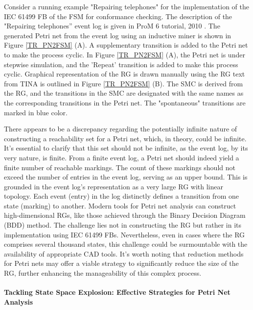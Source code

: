 \begin{bibunit}
Consider a running example "Repairing telephones" for the implementation of the IEC 61499 FB of the FSM for conformance checking. The description of the "Repairing telephones'' event log is given in ProM 6 tutorial, 2010 \cite{prom6tutorial}. The generated Petri net from the event log using an inductive miner is shown in Figure \ref{TR_PN2FSM} (A). A supplementary transition is added to the Petri net to make the process cyclic. In Figure \ref{TR_PN2FSM} (A), the Petri net is under stepwise simulation, and the 'Repeat' transition is added to make this process cyclic. Graphical representation of the RG is drawn manually using the RG text from TINA is outlined in Figure \ref{TR_PN2FSM} (B). The SMC is derived from the RG, and the transitions in the SMC are designated with the same names as the corresponding transitions in the Petri net. The "spontaneous" transitions are marked in blue color.


There appears to be a discrepancy regarding the potentially infinite nature of constructing a reachability set for a Petri net, which, in theory, could be infinite. It's essential to clarify that this set should not be infinite, as the event log, by its very nature, is finite. From a finite event log, a Petri net should indeed yield a finite number of reachable markings. The count of these markings should not exceed the number of entries in the event log, serving as an upper bound. This is grounded in the event log's representation as a very large RG with linear topology. Each event (entry) in the log distinctly defines a transition from one state (marking) to another. Modern tools for Petri net analysis can construct high-dimensional RGs, like those achieved through the Binary Decision Diagram (BDD) method. The challenge lies not in constructing the RG but rather in its implementation using IEC 61499 FBs. Nevertheless, even in cases where the RG comprises several thousand states, this challenge could be surmountable with the availability of appropriate CAD tools. It's worth noting that reduction methods for Petri nets may offer a viable strategy to significantly reduce the size of the RG, further enhancing the manageability of this complex process.

\paragraph{Tackling State Space Explosion: Effective Strategies for Petri Net Analysis}


\end{bibunit}
